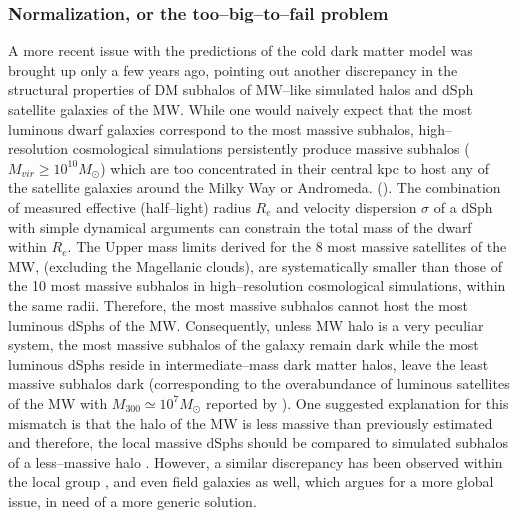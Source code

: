 \documentclass[paper=a4, fontsize=11pt]{scrartcl} %
\numberwithin{equation}{section} %
\numberwithin{figure}{section} %
\numberwithin{table}{section} %
\begin{document}
\subsubsection{Normalization, or the too--big--to--fail problem}
\label{subsec:too-big-to-fail}
A more recent issue with the predictions of the cold dark matter model was brought up only a few years ago, pointing out another discrepancy in the structural properties of DM subhalos of MW--like simulated halos and dSph satellite galaxies of the MW. While one would naively expect that the most luminous dwarf galaxies correspond to the most massive subhalos, high--resolution cosmological simulations persistently produce massive subhalos ($M_{vir} \geq 10^{10} M_\odot$) which are too concentrated in their central kpc to host any of the satellite galaxies around the Milky Way or Andromeda. (\cite{Boylan-Kolchin+2011, Boylan--Kolchin+2012}). The combination of measured effective (half--light) radius $R_e$ and velocity dispersion $\sigma$ of a dSph with simple dynamical arguments can constrain the total mass of the dwarf within $R_e$. The Upper mass limits derived for the 8 most massive satellites of the MW, (excluding the Magellanic clouds), are systematically smaller than those of the 10 most massive subhalos in high--resolution cosmological simulations, within the same radii. Therefore, the most massive subhalos cannot host the most luminous dSphs of the MW. Consequently, unless MW halo is a very peculiar system, the most massive subhalos of the galaxy remain dark while the most luminous dSphs reside in intermediate--mass dark matter halos, leave the least massive subhalos dark (corresponding to the overabundance of luminous satellites of the MW with $M_{300} \simeq 10^7 M_\odot$ reported by \citet[][]{Kroupa+2010}). One suggested explanation for this mismatch is that the halo of the MW is less massive than previously estimated and therefore, the local massive dSphs should be compared to simulated subhalos of a less--massive halo \citep[][]{Boylan--Kolchin+2012, Wang+2012, Vera--Ciro+2013}. However, a similar discrepancy has been observed within the local group \citep[][]{Kirby+2014, Garrison--Kimmel+2014, Tollerud+2014}, and even field galaxies \citep[][]{Papastergis+2015} as well, which argues for a more global issue, in need of a more generic solution. 

\end{document}
